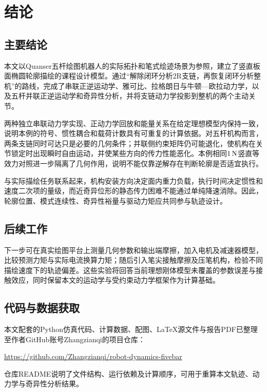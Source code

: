 \section{结论}

\subsection{主要结论}

本文以Quanser五杆绘图机器人的实际拓扑和笔式绘迹场景为参照，建立了竖直板面椭圆轮廓描绘的课程设计模型。通过“解除闭环分析2R支链，再恢复闭环分析整机”的路线，完成了串联正逆运动学、雅可比、拉格朗日与牛顿—欧拉动力学，以及五杆并联正逆运动学和奇异性分析，并将支链动力学投影到整机的两个主动关节。

两种独立串联动力学实现、正动力学回放和能量关系在给定理想模型内保持一致，说明本例的符号、惯性耦合和载荷计数具有可重复的计算依据。对五杆机构而言，两条支链同时可达只是必要的几何条件；并联侧约束矩阵仍可能退化，使机构在关节锁定时出现瞬时自由运动，并使某些方向的传力性能恶化。本例相同$1\,\mathrm{N}$竖直等效力对照进一步隔离了几何作用，说明不能仅靠逆解存在判断轮廓是否适宜执行。

与实际描绘任务联系起来，机构安装方向决定面内重力负载，执行时间决定惯性和速度二次项的量级，而近奇异位形的静态传力困难不能通过单纯降速消除。因此，轮廓位置、模式连续性、奇异性裕量与驱动力矩应共同参与轨迹设计。

\subsection{后续工作}

下一步可在真实绘图平台上测量几何参数和输出端摩擦，加入电机及减速器模型，比较预测力矩与实际电流换算力矩；随后引入笔尖接触摩擦及压笔机构，检验不同描绘速度下的轨迹偏差。这些实验将回答当前理想刚体模型未覆盖的参数误差与接触效应，同时保留本文的运动学与受约束动力学框架作为计算基础。

\subsection{代码与数据获取}

本文配套的Python仿真代码、计算数据、配图、LaTeX源文件与报告PDF已整理至作者GitHub账号Zhangzianqi的项目仓库：
\begin{center}
\small\url{https://github.com/Zhangzianqi/robot-dynamics-fivebar}
\end{center}
仓库README说明了文件结构、运行依赖及计算顺序，可用于重算本文轨迹、动力学与奇异性分析结果。
